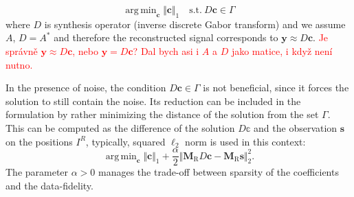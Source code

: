 \documentclass[conference]{IEEEtran}
\newcommand{\todo}[1]{\textcolor{red}{#1}}
\begin{document}
\begin{equation}
	\label{eq:synthesis.gamma}
	\mathop {\operatorname{arg \, min}}_\mathbf {c}\Vert \mathbf {c}\Vert _1 \quad \text{s.t.}\ D\mathbf {c}\in \Gamma
\end{equation} 
where $ D $ is synthesis operator (inverse discrete Gabor transform) and we assume $ A $, $ D = A^* $ and therefore the reconstructed signal corresponds to $ \mathbf {y} \approx  D\mathbf {c}$.
\todo{Je správně $ \mathbf {y} \approx  D\mathbf {c}$, nebo $ \mathbf {y} =  D\mathbf {c}$?}
\todo{Dal bych asi i $A$ a $D$ jako matice, i když není nutno.}


%
%		

In the presence of noise, the condition $D\mathbf {c}\in \Gamma$ is not beneficial, since it forces the solution to still contain the noise.
Its reduction can be included in the formulation by rather minimizing the distance of the solution from the set $\Gamma$.
This can be computed as the difference of the solution $D\mathbb{c}$ and the observation $\mathbf{s}$  on the positions $I^R$, typically, squared $\ell_2$ norm is used in this context:
\begin{equation}
	\label{eq:synthesis.dist}
	\mathop {\operatorname{arg \, min}}_\mathbf {c}\Vert \mathbf {c}\Vert _1 + \frac{\alpha}{2} \Vert \mathbf{M}_{\mathrm{R}} D\mathbf {c} - \mathbf{M}_{\mathrm{R}} \mathbf{s} \Vert^2_2.
\end{equation} 
The parameter $\alpha > 0$ manages the trade-off between sparsity of the coefficients and the data-fidelity.
\end{document}
